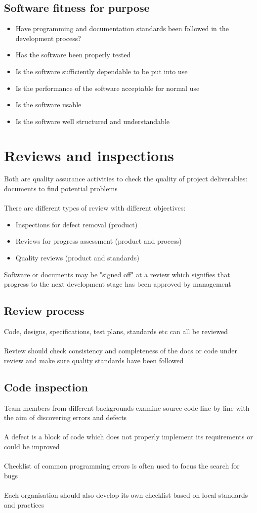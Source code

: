 \documentclass{article}[18pt]
\begin{document}
\subsection{Software fitness for purpose}
\begin{itemize}
	\item Have programming and documentation standards been followed in the development process?
	\item Has the software been properly tested
	\item Is the software sufficiently dependable to be put into use
	\item Is the performance of the software acceptable for normal use
	\item Is the software usable
	\item Is the software well structured and understandable
\end{itemize}
\section{Reviews and inspections}
Both are quality assurance activities to check the quality of project deliverables: documents to find potential problems\\
\\
There are different types of review with different objectives:
\begin{itemize}
	\item Inspections for defect removal (product)
	\item Reviews for progress assessment (product and process)
	\item Quality reviews (product and standards)
\end{itemize}
Software or documents may be "signed off" at a review which signifies that progress to the next development stage has been approved by management
\subsection{Review process}
Code, designs, specifications, test plans, standards etc can all be reviewed\\
\\
Review should check consistency and completeness of the docs or code under review and make sure quality standards have been followed
\subsection{Code inspection}
Team members from different backgrounds examine source code line by line with the aim of discovering errors and defects\\
\\
A defect is a block of code which does not properly implement its requirements or could be improved\\
\\
Checklist of common programming errors is often used to focus the search for bugs\\
\\
Each organisation should also develop its own checklist based on local standards and practices
\end{document}
